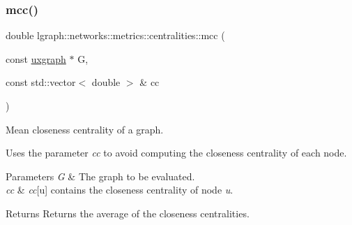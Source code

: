 \subsubsection{\texorpdfstring{mcc()}{mcc()}\hspace{0.1cm}{\footnotesize\ttfamily [4/4]}}
{\footnotesize\ttfamily double lgraph\+::networks\+::metrics\+::centralities\+::mcc (\begin{DoxyParamCaption}\item[{const \hyperlink{classlgraph_1_1uxgraph}{uxgraph} $\ast$}]{G,  }\item[{const std\+::vector$<$ double $>$ \&}]{cc }\end{DoxyParamCaption})}



Mean closeness centrality of a graph. 

Uses the parameter {\itshape cc} to avoid computing the closeness centrality of each node.


\begin{DoxyParams}{Parameters}
{\em G} & The graph to be evaluated. \\
\hline
{\em cc} & {\itshape cc}\mbox{[}u\mbox{]} contains the closeness centrality of node {\itshape u}. \\
\hline
\end{DoxyParams}
\begin{DoxyReturn}{Returns}
Returns the average of the closeness centralities. 
\end{DoxyReturn}

